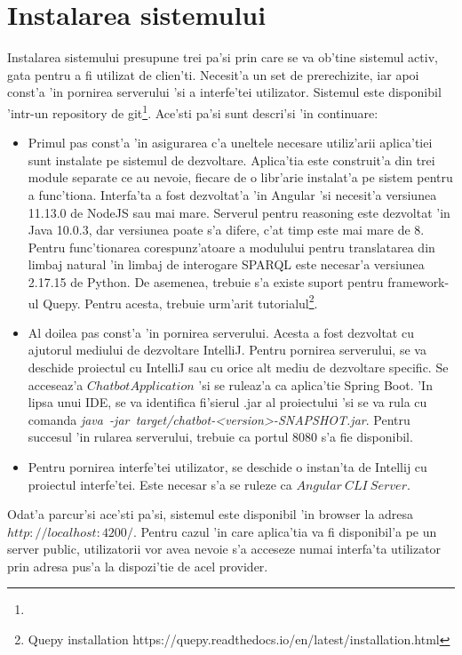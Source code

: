 \documentclass[12pt,a4paper,twoside]{report}
\begin{document}
\section{Instalarea sistemului}

Instalarea sistemului presupune trei pa'si prin care se va ob'tine sistemul activ, gata pentru a fi utilizat de clien'ti. Necesit'a un set de prerechizite, iar apoi const'a 'in pornirea serverului 'si a interfe'tei utilizator. Sistemul este disponibil 'intr-un repository de git\footnote{ }. Ace'sti pa'si sunt descri'si 'in continuare:

\begin{itemize}
    \item Primul pas const'a 'in asigurarea c'a uneltele necesare utiliz'arii aplica'tiei sunt instalate pe sistemul de dezvoltare. Aplica'tia este construit'a din trei module separate ce au nevoie, fiecare de o libr'arie instalat'a pe sistem pentru a func'tiona. Interfa'ta a fost dezvoltat'a 'in Angular 'si necesit'a versiunea 11.13.0 de NodeJS sau mai mare. Serverul pentru reasoning este dezvoltat 'in Java 10.0.3, dar versiunea poate s'a difere, c'at timp este mai mare de 8. Pentru func'tionarea corespunz'atoare a modulului pentru translatarea din limbaj natural 'in limbaj de interogare SPARQL este necesar'a versiunea 2.17.15 de Python. De asemenea, trebuie s'a existe suport pentru framework-ul Quepy. Pentru acesta, trebuie urm'arit tutorialul\footnote{Quepy installation https://quepy.readthedocs.io/en/latest/installation.html}.
    \item Al doilea pas const'a 'in pornirea serverului. Acesta a fost dezvoltat cu ajutorul mediului de dezvoltare IntelliJ. Pentru pornirea serverului, se va deschide proiectul cu IntelliJ sau cu orice alt mediu de dezvoltare specific. Se acceseaz'a $ChatbotApplication$ 'si se ruleaz'a ca aplica'tie Spring Boot. 'In lipsa unui IDE, se va identifica fi'sierul .jar al proiectului 'si se va rula cu comanda {\it java\ -jar\ target/chatbot-<version>-SNAPSHOT.jar}. Pentru succesul 'in rularea serverului, trebuie ca portul 8080 s'a fie disponibil.
    \item Pentru pornirea interfe'tei utilizator, se deschide o instan'ta de Intellij cu proiectul interfe'tei. Este necesar s'a se ruleze ca $Angular\ CLI\ Server$. 
\end{itemize}

Odat'a parcur'si ace'sti pa'si, sistemul este disponibil 'in browser la adresa $http://localhost:4200/$. Pentru cazul 'in care aplica'tia va fi disponibil'a pe un server public, utilizatorii vor avea nevoie s'a acceseze numai interfa'ta utilizator prin adresa pus'a la dispozi'tie de acel provider.
\end{document}
